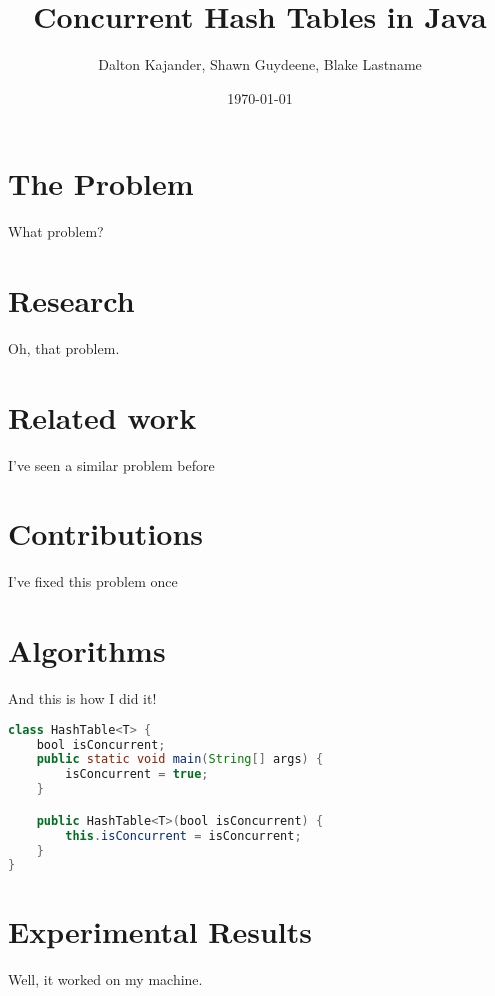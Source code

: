 \documentclass{article}
\begin{document}
\author{Dalton Kajander, Shawn Guydeene, Blake Lastname}
\title{Concurrent Hash Tables in Java}
\date{\today{}}
\maketitle

\newpage
\tableofcontents
\newpage

\section{The Problem}
What problem?

\section{Research}
Oh, that problem.

\section{Related work}
I've seen a similar problem before

\section{Contributions}
I've fixed this problem once

\section{Algorithms}
And this is how I did it!
\begin{lstlisting}[language={Java},caption=Testing surce code in \LaTeX{}.,breaklines=true,frame=single]
class HashTable<T> {
    bool isConcurrent;
    public static void main(String[] args) {
        isConcurrent = true;
    }

    public HashTable<T>(bool isConcurrent) {
        this.isConcurrent = isConcurrent;
    }
}
\end{lstlisting}

\section{Experimental Results}
Well, it worked on my machine. 



\newpage
\end{document}
